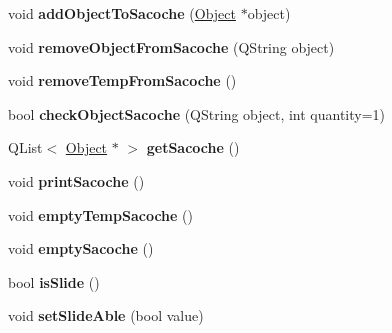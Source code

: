 \begin{DoxyCompactItemize}
\item 
\hypertarget{class_pingouin_ad91b21a996f75e32a78c203eb7490446}{}void {\bfseries add\+Object\+To\+Sacoche} (\hyperlink{class_object}{Object} $\ast$object)\label{class_pingouin_ad91b21a996f75e32a78c203eb7490446}

\item 
\hypertarget{class_pingouin_a73130bc706f0c1a40a20f05d0d3a3ffa}{}void {\bfseries remove\+Object\+From\+Sacoche} (Q\+String object)\label{class_pingouin_a73130bc706f0c1a40a20f05d0d3a3ffa}

\item 
\hypertarget{class_pingouin_a7bc2b0b92b4093f59821a683e6d71b14}{}void {\bfseries remove\+Temp\+From\+Sacoche} ()\label{class_pingouin_a7bc2b0b92b4093f59821a683e6d71b14}

\item 
\hypertarget{class_pingouin_a53145c212327b2a733237e1eb55aad24}{}bool {\bfseries check\+Object\+Sacoche} (Q\+String object, int quantity=1)\label{class_pingouin_a53145c212327b2a733237e1eb55aad24}

\item 
\hypertarget{class_pingouin_ae0bba74647869527534c9aa1da1c3f9e}{}Q\+List$<$ \hyperlink{class_object}{Object} $\ast$ $>$ {\bfseries get\+Sacoche} ()\label{class_pingouin_ae0bba74647869527534c9aa1da1c3f9e}

\item 
\hypertarget{class_pingouin_a736f73e55524b59c00479aef1f91f94d}{}void {\bfseries print\+Sacoche} ()\label{class_pingouin_a736f73e55524b59c00479aef1f91f94d}

\item 
\hypertarget{class_pingouin_a1adb59f85236324915f9211bc111faa6}{}void {\bfseries empty\+Temp\+Sacoche} ()\label{class_pingouin_a1adb59f85236324915f9211bc111faa6}

\item 
\hypertarget{class_pingouin_af53b1d8d5167cd2fc039f97219f22064}{}void {\bfseries empty\+Sacoche} ()\label{class_pingouin_af53b1d8d5167cd2fc039f97219f22064}

\item 
\hypertarget{class_pingouin_a31dcd728180d2e85cf1c696ad2f0b062}{}bool {\bfseries is\+Slide} ()\label{class_pingouin_a31dcd728180d2e85cf1c696ad2f0b062}

\item 
\hypertarget{class_pingouin_aecce86d070fcfef325a55676043866ab}{}void {\bfseries set\+Slide\+Able} (bool value)\label{class_pingouin_aecce86d070fcfef325a55676043866ab}


\end{DoxyCompactItemize}
